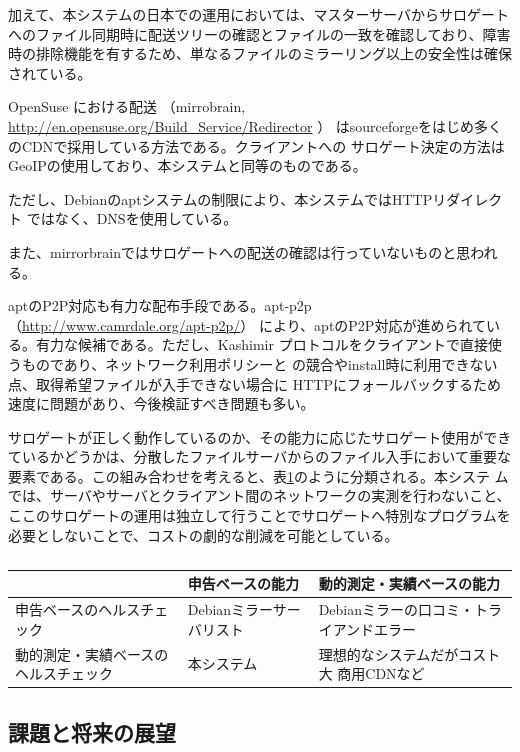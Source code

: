 \documentclass[mingoth,a4paper]{jsarticle}
\begin{document}
加えて、本システムの日本での運用においては、マスターサーバからサロゲート
へのファイル同期時に配送ツリーの確認とファイルの一致を確認しており、障害
時の排除機能を有するため、単なるファイルのミラーリング以上の安全性は確保
されている。


OpenSuse における配送
（mirrobrain, \url{http://en.opensuse.org/Build_Service/Redirector} ）
はsourceforgeをはじめ多くのCDNで採用している方法である。クライアントへの
サロゲート決定の方法はGeoIPの使用しており、本システムと同等のものである。

ただし、Debianのaptシステムの制限により、本システムではHTTPリダイレクト
ではなく、DNSを使用している。

また、mirrorbrainではサロゲートへの配送の確認は行っていないものと思われ
る。


aptのP2P対応も有力な配布手段である。apt-p2p
（\url{http://www.camrdale.org/apt-p2p/}）
により、aptのP2P対応が進められている。有力な候補である。ただし、Kashimir
プロトコルをクライアントで直接使うものであり、ネットワーク利用ポリシーと
の競合やinstall時に利用できない点、取得希望ファイルが入手できない場合に
HTTPにフォールバックするため速度に問題があり、今後検証すべき問題も多い。

サロゲートが正しく動作しているのか、その能力に応じたサロゲート使用ができ
ているかどうかは、分散したファイルサーバからのファイル入手において重要な
要素である。この組み合わせを考えると、表\ref{health check}のように分類される。本システ
ムでは、サーバやサーバとクライアント間のネットワークの実測を行わないこと、
ここのサロゲートの運用は独立して行うことでサロゲートへ特別なプログラムを
必要としないことで、コストの劇的な削減を可能としている。

\begin{table}[htbp]
\caption{}
\begin{tabular}{|l|l|l|}
\hline
 & 申告ベースの能力 & 動的測定・実績ベースの能力 \\ \hline
申告ベースのヘルスチェック & Debianミラーサーバリスト & Debianミラーの口コミ・トライアンドエラー \\ \hline
動的測定・実績ベースのヘルスチェック & 本システム & 理想的なシステムだがコスト大
商用CDNなど \\ \hline
\end{tabular}
\label{health check}
\end{table}

\subsection{課題と将来の展望}
\end{document}

